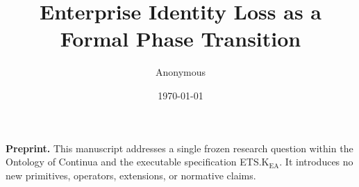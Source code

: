 ﻿\documentclass[11pt]{article}
\title{Enterprise Identity Loss as a Formal Phase Transition}
\author{Anonymous}
\date{\today}
\begin{document}
\maketitle

\begin{center}
\textbf{Preprint.}
This manuscript addresses a single frozen research question within the Ontology
of Continua and the executable specification ETS.K$_{\mathrm{EA}}$. It introduces
no new primitives, operators, extensions, or normative claims.
\end{center}

\bigskip























\end{document}
